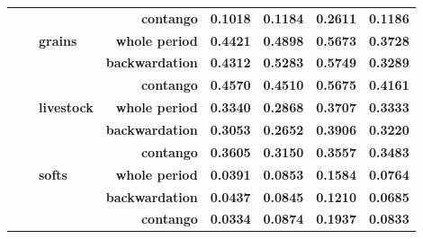 \documentclass[
  authoryear,
  preprint,
  3p]{elsarticle}
\begin{document}
\begin{longtable}[t]{>{}l>{}l>{}l>{}r>{}r>{}r>{}r>{}r}
\textbf{} & \textbf{} & \textbf{} & \textbf{contango} & \textcolor[HTML]{4285f4}{\textbf{0.1018}} & \textcolor[HTML]{4285f4}{\textbf{0.1184}} & \textcolor[HTML]{4285f4}{\textbf{0.2611}} & \textcolor[HTML]{4285f4}{\textbf{0.1186}}\\
\textbf{} & \textbf{} & \textbf{grains} & \textbf{whole period} & \textcolor[HTML]{4285f4}{\textbf{0.4421}} & \textcolor[HTML]{4285f4}{\textbf{0.4898}} & \textcolor[HTML]{4285f4}{\textbf{0.5673}} & \textcolor[HTML]{4285f4}{\textbf{0.3728}}\\
\addlinespace
\textbf{} & \textbf{} & \textbf{} & \textbf{backwardation} & \textcolor[HTML]{4285f4}{\textbf{0.4312}} & \textcolor[HTML]{4285f4}{\textbf{0.5283}} & \textcolor[HTML]{4285f4}{\textbf{0.5749}} & \textcolor[HTML]{4285f4}{\textbf{0.3289}}\\
\textbf{} & \textbf{} & \textbf{} & \textbf{contango} & \textcolor[HTML]{4285f4}{\textbf{0.4570}} & \textcolor[HTML]{4285f4}{\textbf{0.4510}} & \textcolor[HTML]{4285f4}{\textbf{0.5675}} & \textcolor[HTML]{4285f4}{\textbf{0.4161}}\\
\textbf{} & \textbf{} & \textbf{livestock} & \textbf{whole period} & \textcolor[HTML]{4285f4}{\textbf{0.3340}} & \textcolor[HTML]{4285f4}{\textbf{0.2868}} & \textcolor[HTML]{4285f4}{\textbf{0.3707}} & \textcolor[HTML]{4285f4}{\textbf{0.3333}}\\
\textbf{} & \textbf{} & \textbf{} & \textbf{backwardation} & \textcolor[HTML]{4285f4}{\textbf{0.3053}} & \textcolor[HTML]{4285f4}{\textbf{0.2652}} & \textcolor[HTML]{4285f4}{\textbf{0.3906}} & \textcolor[HTML]{4285f4}{\textbf{0.3220}}\\
\textbf{} & \textbf{} & \textbf{} & \textbf{contango} & \textcolor[HTML]{4285f4}{\textbf{0.3605}} & \textcolor[HTML]{4285f4}{\textbf{0.3150}} & \textcolor[HTML]{4285f4}{\textbf{0.3557}} & \textcolor[HTML]{4285f4}{\textbf{0.3483}}\\
\addlinespace
\textbf{} & \textbf{} & \textbf{softs} & \textbf{whole period} & \textcolor[HTML]{4285f4}{\textbf{0.0391}} & \textcolor[HTML]{4285f4}{\textbf{0.0853}} & \textcolor[HTML]{4285f4}{\textbf{0.1584}} & \textcolor[HTML]{4285f4}{\textbf{0.0764}}\\
\textbf{} & \textbf{} & \textbf{} & \textbf{backwardation} & \textcolor[HTML]{4285f4}{\textbf{0.0437}} & \textcolor[HTML]{4285f4}{\textbf{0.0845}} & \textcolor[HTML]{4285f4}{\textbf{0.1210}} & \textcolor[HTML]{4285f4}{\textbf{0.0685}}\\
\textbf{} & \textbf{} & \textbf{} & \textbf{contango} & \textcolor[HTML]{4285f4}{\textbf{0.0334}} & \textcolor[HTML]{4285f4}{\textbf{0.0874}} & \textcolor[HTML]{4285f4}{\textbf{0.1937}} & \textcolor[HTML]{4285f4}{\textbf{0.0833}}\\

\end{longtable}
\end{document}
